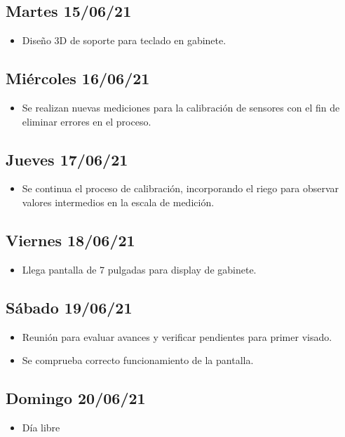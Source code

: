 \subsection*{Martes 15/06/21}
    \begin{itemize}
        \item Diseño 3D de soporte para teclado en gabinete.
    \end{itemize}
    
\subsection*{Miércoles 16/06/21}
    \begin{itemize}
        \item Se realizan nuevas mediciones para la calibración de sensores con el fin de eliminar errores en el proceso.
    \end{itemize}
    
\subsection*{Jueves 17/06/21}
    \begin{itemize}
        \item Se continua el proceso de calibración, incorporando el riego para observar valores intermedios en la escala de medición.
    \end{itemize}
    
\subsection*{Viernes 18/06/21}
    \begin{itemize}
        \item Llega pantalla de 7 pulgadas para display de gabinete.
    \end{itemize}
    
\subsection*{Sábado 19/06/21}
    \begin{itemize}
        \item Reunión para evaluar avances y verificar pendientes para primer visado. 
        \item Se comprueba correcto funcionamiento de la pantalla.
    \end{itemize}
    
\subsection*{Domingo 20/06/21}
    \begin{itemize}
        \item Día libre 
    \end{itemize}

